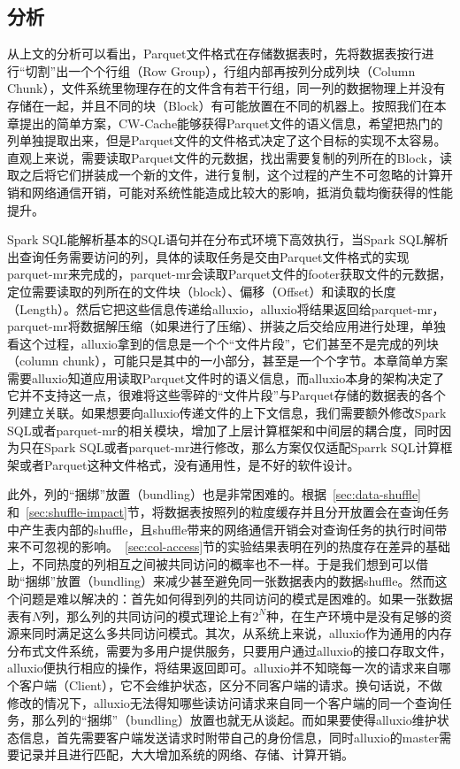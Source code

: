 \subsection{分析}
\label{subsec:simp-analysis}

\par 从上文的分析可以看出，Parquet文件格式在存储数据表时，先将数据表按行进行“切割”出一个个行组（Row Group），行组内部再按列分成列块（Column Chunk），文件系统里物理存在的文件含有若干行组，同一列的数据物理上并没有存储在一起，并且不同的块（Block）有可能放置在不同的机器上。按照我们在本章提出的简单方案，CW-Cache能够获得Parquet文件的语义信息，希望把热门的列单独提取出来，但是Parquet文件的文件格式决定了这个目标的实现不太容易。直观上来说，需要读取Parquet文件的元数据，找出需要复制的列所在的Block，读取之后将它们拼装成一个新的文件，进行复制，这个过程的产生不可忽略的计算开销和网络通信开销，可能对系统性能造成比较大的影响，抵消负载均衡获得的性能提升。

\par Spark SQL能解析基本的SQL语句并在分布式环境下高效执行，当Spark SQL解析出查询任务需要访问的列，具体的读取任务是交由Parquet文件格式的实现parquet-mr\cite{parquet-mr}来完成的，parquet-mr会读取Parquet文件的footer获取文件的元数据，定位需要读取的列所在的文件块（block）、偏移（Offset）和读取的长度（Length）。然后它把这些信息传递给alluxio，alluxio将结果返回给parquet-mr，parquet-mr将数据解压缩（如果进行了压缩）、拼装之后交给应用进行处理，单独看这个过程，alluxio拿到的信息是一个个“文件片段”，它们甚至不是完成的列块（column chunk），可能只是其中的一小部分，甚至是一个个字节。本章简单方案需要alluxio知道应用读取Parquet文件时的语义信息，而alluxio本身的架构决定了它并不支持这一点，很难将这些零碎的“文件片段”与Parquet存储的数据表的各个列建立关联。如果想要向alluxio传递文件的上下文信息，我们需要额外修改Spark SQL或者parquet-mr的相关模块，增加了上层计算框架和中间层的耦合度，同时因为只在Spark SQL或者parquet-mr进行修改，那么方案仅仅适配Sparrk SQL计算框架或者Parquet这种文件格式，没有通用性，是不好的软件设计。

\par 此外，列的“捆绑”放置（bundling）也是非常困难的。根据~\ref{sec:data-shuffle}和~\ref{sec:shuffle-impact}节，将数据表按照列的粒度缓存并且分开放置会在查询任务中产生表内部的shuffle，且shuffle带来的网络通信开销会对查询任务的执行时间带来不可忽视的影响。~\ref{sec:col-access}节的实验结果表明在列的热度存在差异的基础上，不同热度的列相互之间被共同访问的概率也不一样。于是我们想到可以借助“捆绑”放置（bundling）来减少甚至避免同一张数据表内的数据shuffle。然而这个问题是难以解决的：首先如何得到列的共同访问的模式是困难的。如果一张数据表有$N$列，那么列的共同访问的模式理论上有$2^N$种，在生产环境中是没有足够的资源来同时满足这么多共同访问模式。其次，从系统上来说，alluxio作为通用的内存分布式文件系统，需要为多用户提供服务，只要用户通过alluxio的接口存取文件，alluxio便执行相应的操作，将结果返回即可。alluxio并不知晓每一次的请求来自哪个客户端（Client），它不会维护状态，区分不同客户端的请求。换句话说，不做修改的情况下，alluxio无法得知哪些读访问请求来自同一个客户端的同一个查询任务，那么列的“捆绑”（bundling）放置也就无从谈起。而如果要使得alluxio维护状态信息，首先需要客户端发送请求时附带自己的身份信息，同时alluxio的master需要记录并且进行匹配，大大增加系统的网络、存储、计算开销。


